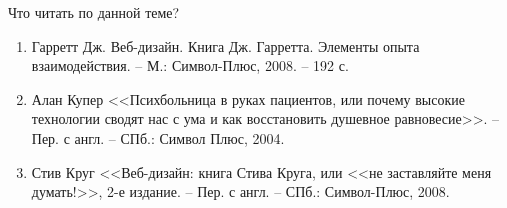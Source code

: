 \documentclass{beamer}
\begin{document}
\begin{frame}{Что читать по данной теме?}
\begin{enumerate}
\item Гарретт Дж.  Веб-дизайн. Книга Дж. Гарретта. Элементы опыта взаимодействия. – М.: Символ-Плюс, 2008. – 192 с.
\item Алан Купер <<Психбольница в руках пациентов, или почему высокие технологии сводят нас с ума и как восстановить душевное равновесие>>. – Пер. с англ. – СПб.: Символ Плюс, 2004.
\item Стив Круг <<Веб-дизайн: книга Стива Круга, или <<не заставляйте меня думать!>>, 2-е издание. – Пер. с англ. – СПб.: Символ-Плюс, 2008.
\end{enumerate}
\end{frame}

\end{document}
